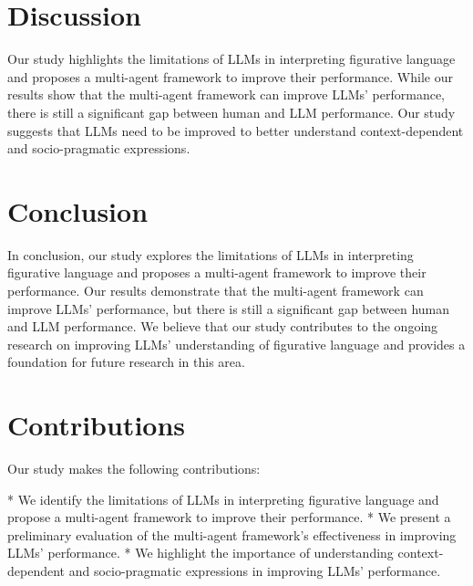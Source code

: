 \documentclass{article}
\begin{document}
\section{Discussion}

Our study highlights the limitations of LLMs in interpreting figurative language and proposes a multi-agent framework to improve their performance. While our results show that the multi-agent framework can improve LLMs' performance, there is still a significant gap between human and LLM performance. Our study suggests that LLMs need to be improved to better understand context-dependent and socio-pragmatic expressions.

\section{Conclusion}

In conclusion, our study explores the limitations of LLMs in interpreting figurative language and proposes a multi-agent framework to improve their performance. Our results demonstrate that the multi-agent framework can improve LLMs' performance, but there is still a significant gap between human and LLM performance. We believe that our study contributes to the ongoing research on improving LLMs' understanding of figurative language and provides a foundation for future research in this area.

\section{Contributions}

Our study makes the following contributions:

* We identify the limitations of LLMs in interpreting figurative language and propose a multi-agent framework to improve their performance.
* We present a preliminary evaluation of the multi-agent framework's effectiveness in improving LLMs' performance.
* We highlight the importance of understanding context-dependent and socio-pragmatic expressions in improving LLMs' performance.
\end{document}
